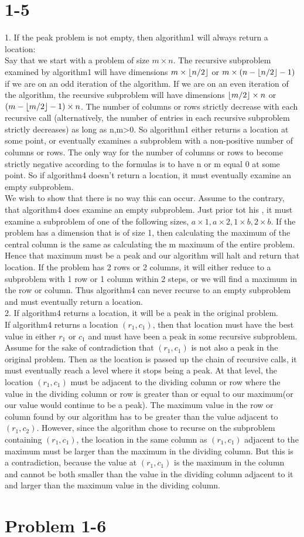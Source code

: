 \documentclass[10pt,a4paper]{article}
\DeclarePairedDelimiter\floor{\lfloor}{\rfloor}
\begin{document}
\section{1-5}
1. If the peak problem is not empty, then algorithm1 will always return a location:\\
Say that we start with a problem of size $m \times n$. The recursive subproblem examined by algorithm1 will have dimensions $m \times \floor{n/2}$ or $m \times (n- \floor{n/2}-1)$ if we are on an odd iteration of the algorithm. If we are on an even iteration of the algorithm,  the recursive subproblem will have dimensions $\floor{m/2} \times n$ or $(m-\floor{m/2}-1) \times n$. The number of columns or rows strictly decrease with each recursive call (alternatively, the number of entries in each recursive subproblem strictly decreases) as long as n,m>0. So algorithm1 either returns a location at some point, or eventually examines a subproblem with a non-positive number of columns or rows. The only way for the number of columns or rows to become strictly negative according to the formulas is to have n or m equal 0 at some point. So if algorithm4 doesn't return a location, it must eventually examine an empty subproblem. \\
We wish to show that there is no way this can occur. Assume to the contrary, that algorithm4 does examine an empty subproblem. Just prior tot his , it must examine a subproblem of one of the following sizes, $a\times 1, a\times 2, 1 \times b, 2 \times b$. If the problem has a dimension that is of size 1, then calculating the maximum of the central column is the same as calculating the m maximum of the entire problem. Hence that maximum must be a peak and our algorithm will halt and return that location. If the problem has 2 rows or 2 columns, it will either reduce to a subproblem with 1 row or 1 column within 2 steps, or we will find a maximum in the row or column. Thus algorithm4 can never recurse to an empty subproblem and must eventually return a location.\\
2. If algorithm4 returns a location, it will be a peak in the original problem. \\
If algorithm4 returns a location $(r_1,c_1)$, then that location must have the best value in either $r_1$ or $c_1$ and must have been a peak in some recursive subproblem. Assume for the sake of contradiction that $(r_1,c_1)$ is not also a peak in the original problem. Then as the location is passed up the chain of recursive calls, it must eventually reach a level where it stops being a peak. At that level, the location $(r_1,c_1)$ must be adjacent to the dividing column or row where the value in the dividing column or row is greater than or equal to our maximum(or our value would continue to be a peak).  The maximum value in the row or column found by our algorithm has to be greater than the value adjacent to $(r_1,c_2)$. However, since the algorithm chose to recurse on the subproblem containing $(r_1,c_1)$, the location in the same column as $(r_1,c_1)$ adjacent to the maximum must be larger than the maximum in the dividing column. But this is a contradiction, because the value at $(r_1,c_1)$ is the maximum in the column and cannot be both smaller than the value in the dividing column adjacent to it and larger than the maximum value in the dividing column.
\section{Problem 1-6}
\end{document}
